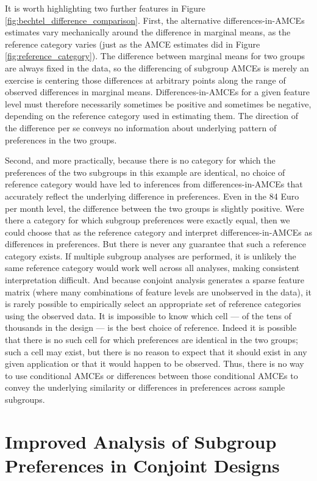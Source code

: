 \documentclass[a4paper,12pt]{article}\usepackage[]{graphicx}\usepackage[]{color}
\begin{document}
It is worth highlighting two further features in Figure \ref{fig:bechtel_difference_comparison}. First, the alternative differences-in-AMCEs estimates vary mechanically around the difference in marginal means, as the reference category varies (just as the AMCE estimates did in Figure \ref{fig:reference_category}). The difference between marginal means for two groups are always fixed in the data, so the differencing of subgroup AMCEs is merely an exercise is centering those differences at arbitrary points along the range of observed differences in marginal means. Differences-in-AMCEs for a given feature level must therefore necessarily sometimes be positive and sometimes be negative, depending on the reference category used in estimating them. The direction of the difference per se conveys no information about underlying pattern of preferences in the two groups. 

Second, and more practically, because there is no category for which the preferences of the two subgroups in this example are identical, no choice of reference category would have led to inferences from differences-in-AMCEs that accurately reflect the underlying difference in preferences. Even in the 84 Euro per month level, the difference between the two groups is slightly positive. Were there a category for which subgroup preferences were exactly equal, then we could choose that as the reference category and interpret differences-in-AMCEs as differences in preferences. But there is never any guarantee that such a reference category exists. If multiple subgroup analyses are performed, it is unlikely the same reference category would work well across all analyses, making consistent interpretation difficult. And because conjoint analysis generates a sparse feature matrix (where many combinations of feature levels are unobserved in the data), it is rarely possible to empirically select an appropriate set of reference categories using the observed data. It is impossible to know which cell --- of the tens of thousands in the design --- is the best choice of reference. Indeed it is possible that there is no such cell for which preferences are identical in the two groups; such a cell may exist, but there is no reason to expect that it should exist in any given application or that it would happen to be observed. Thus, there is no way to use conditional AMCEs or differences between those conditional AMCEs to convey the underlying similarity or differences in preferences across sample subgroups.


\section*{Improved Analysis of Subgroup Preferences in Conjoint Designs}\label{sec:marginalmeans}
\end{document}
